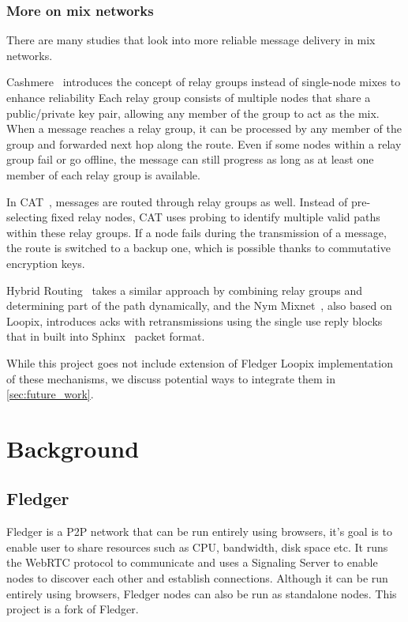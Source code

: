 \documentclass[a4paper,11pt,oneside]{report}
\begin{document}
\subsection{More on mix networks}

There are many studies that look into more reliable message delivery in mix networks.

Cashmere~\cite{cashmere}  introduces the concept of relay groups instead of single-node mixes to enhance reliability Each relay group consists of multiple nodes that share a public/private key pair, allowing any member of the group to act as the mix. When a message reaches a relay group, it can be processed by any member of the group and forwarded next hop along the route. Even if some nodes within a relay group fail or go offline, the message can still progress as long as at least one member of each relay group is available.

In CAT~\cite{CAT}, messages are routed through relay groups as well. Instead of pre-selecting fixed relay nodes, CAT uses probing to identify multiple valid paths within these relay groups. If a node fails during the transmission of a message, the route is switched to a backup one, which is possible thanks to commutative encryption keys.

Hybrid Routing~\cite{hybrid_routing} takes a similar approach by combining relay groups and determining part of the path dynamically, and the Nym Mixnet~\cite{nym}, also based on Loopix, introduces acks with retransmissions using the single use reply blocks that in built into Sphinx~\cite{sphinx} packet format.

While this project goes not include extension of Fledger Loopix implementation of these mechanisms, we discuss potential ways to integrate them in \autoref{sec:future_work}.


\chapter{Background}



\section{Fledger}
\label{sec:fledger}
Fledger is a P2P network that can be run entirely using browsers, it's goal is to enable user to share resources such as CPU, bandwidth, disk space etc. It runs the WebRTC protocol to communicate and uses a Signaling Server to enable nodes to discover each other and establish connections. Although it can be run entirely using browsers, Fledger nodes can also be run as standalone nodes. This project is a fork of Fledger.
\end{document}

